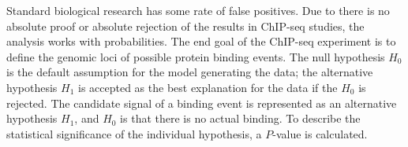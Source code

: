 







Standard biological research has some rate of false positives. 
Due to there is no absolute proof or absolute rejection of the results in ChIP-seq studies, the analysis works with probabilities.
The end goal of the ChIP-seq experiment is to define the genomic loci of possible protein binding events. 
The null hypothesis $H_{0}$ is the default assumption for the model generating the data; the alternative hypothesis $H_{1}$ is accepted as the best explanation for the data if the $H_{0}$ is rejected.
The candidate signal of a binding event is represented as an alternative hypothesis $H_{1}$, and $H_{0}$ is that there is no actual binding. 
To describe the statistical significance of the individual hypothesis, a $P$-value is calculated.

